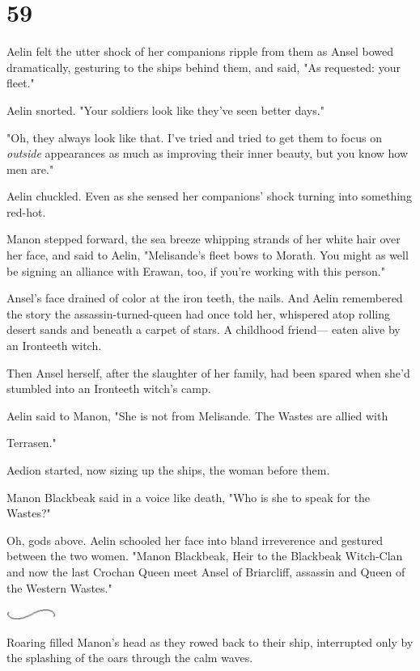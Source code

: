 
\chapter{59}

Aelin felt the utter shock of her companions ripple from them as Ansel bowed dramatically, gesturing to the ships behind them, and said, "As requested: your fleet."

Aelin snorted. "Your soldiers look like they've seen better days."

"Oh, they always look like that. I've tried and tried to get them to focus on \emph{outside} appearances as much as improving their inner beauty, but  you know how men are."

Aelin chuckled. Even as she sensed her companions' shock turning into something red-hot.

Manon stepped forward, the sea breeze whipping strands of her white hair over her face, and said to Aelin, "Melisande's fleet bows to Morath. You might as well be signing an alliance with Erawan, too, if you're working with this  person."

Ansel's face drained of color at the iron teeth, the nails. And Aelin remembered the story the assassin-turned-queen had once told her, whispered atop rolling desert sands and beneath a carpet of stars. A childhood friend--- eaten alive by an Ironteeth witch.

Then Ansel herself, after the slaughter of her family, had been spared when she'd stumbled into an Ironteeth witch's camp.

Aelin said to Manon, "She is not from Melisande. The Wastes are allied with

Terrasen."

Aedion started, now sizing up the ships, the woman before them.

Manon Blackbeak said in a voice like death, "Who is she to speak for the Wastes?"

Oh, gods above. Aelin schooled her face into bland irreverence and gestured between the two women. "Manon Blackbeak, Heir to the Blackbeak Witch-Clan and now the last Crochan Queen  meet Ansel of Briarcliff, assassin and Queen of the Western Wastes."

\includegraphics[width=0.65in,height=0.13in]{images/seperator}

Roaring filled Manon's head as they rowed back to their ship, interrupted only by the splashing of the oars through the calm waves.

